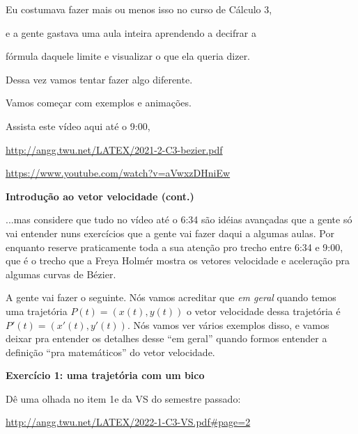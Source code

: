 \documentclass[oneside,12pt]{article}
\begin{document}
\ssk

Eu costumava fazer mais ou menos isso no curso de Cálculo 3,

e a gente gastava uma aula inteira aprendendo a decifrar a

fórmula daquele limite e visualizar o que ela queria dizer.

\msk

Dessa vez vamos tentar fazer algo diferente.

Vamos começar com exemplos e animações.

Assista este vídeo aqui até o 9:00,

\ssk

{\footnotesize

\url{http://angg.twu.net/LATEX/2021-2-C3-bezier.pdf}

\url{https://www.youtube.com/watch?v=aVwxzDHniEw}

}

\ssk


\newpage

{\bf Introdução ao vetor velocidade (cont.)}

\ssk

...mas considere que tudo no vídeo até o 6:34 são idéias avançadas que
a gente só vai entender nuns exercícios que a gente vai fazer daqui a
algumas aulas. Por enquanto reserve praticamente toda a sua atenção
pro trecho entre 6:34 e 9:00, que é o trecho que a Freya Holmér mostra
os vetores velocidade e aceleração pra algumas curvas de Bézier.

A gente vai fazer o seguinte. Nós vamos acreditar que {\sl em geral}
quando temos uma trajetória $P(t) = (x(t),y(t))$ o vetor velocidade
dessa trajetória é $P'(t) = (x'(t),y'(t))$. Nós vamos ver vários
exemplos disso, e vamos deixar pra entender os detalhes desse ``em
geral'' quando formos entender a definição ``pra matemáticos'' do
vetor velocidade.

\newpage

{\bf Exercício 1: uma trajetória com um bico}

Dê uma olhada no item 1e da VS do semestre passado:

\ssk

{\footnotesize

\url{http://angg.twu.net/LATEX/2022-1-C3-VS.pdf#page=2}

}
\end{document}
